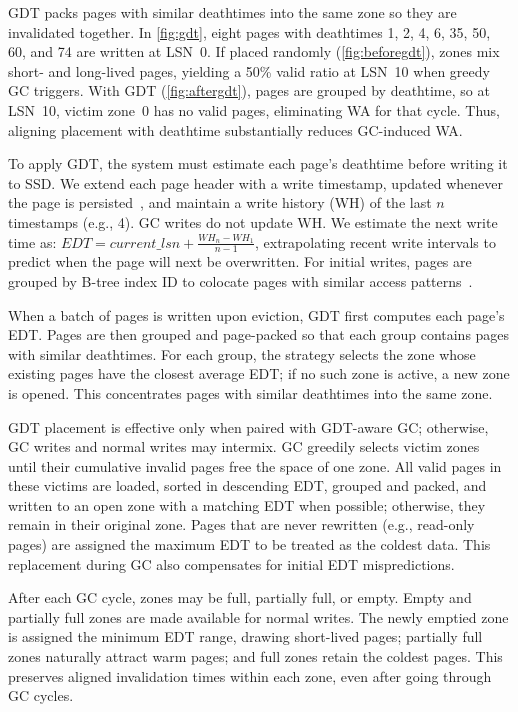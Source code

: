 GDT packs pages with similar deathtimes into the same zone so they are invalidated together. 
In \cref{fig:gdt}, eight pages with deathtimes 1, 2, 4, 6, 35, 50, 60, and 74 are written at LSN~0. 
If placed randomly (\cref{fig:beforegdt}), zones mix short- and long-lived pages, yielding a 50\% valid ratio at LSN~10 when greedy GC triggers. 
With GDT (\cref{fig:aftergdt}), pages are grouped by deathtime, so at LSN~10, victim zone~0 has no valid pages, eliminating WA for that cycle. 
Thus, aligning placement with deathtime substantially reduces GC-induced WA.

To apply GDT, the system must estimate each page’s deathtime before writing it to SSD.
We extend each page header with a write timestamp, updated whenever the page is persisted~\cite{DBLP:journals/pvldb/VohringerL23}, and maintain a write history (WH) of the last $n$ timestamps (e.g., 4). GC writes do not update WH.
We estimate the next write time as: $\textit{EDT} = \textit{current\_lsn} + \frac{\textit{WH}_n - \textit{WH}_1}{n - 1}$,
extrapolating recent write intervals to predict when the page will next be overwritten.
For initial writes, pages are grouped by B-tree index ID to colocate pages with similar access patterns~\cite{DBLP:conf/sigmod/OzmenSSD10}.

When a batch of pages is written upon eviction, GDT first computes each page’s EDT.
Pages are then grouped and page-packed so that each group contains pages with similar deathtimes.
For each group, the strategy selects the zone whose existing pages have the closest average EDT; if no such zone is active, a new zone is opened.
This concentrates pages with similar deathtimes into the same zone.

GDT placement is effective only when paired with GDT-aware GC; otherwise, GC writes and normal writes may intermix.
GC greedily selects victim zones until their cumulative invalid pages free the space of one zone.
All valid pages in these victims are loaded, sorted in descending EDT, grouped and packed, and written to an open zone with a matching EDT when possible; otherwise, they remain in their original zone.
Pages that are never rewritten (e.g., read-only pages) are assigned the maximum EDT to be treated as the coldest data.
This replacement during GC also compensates for initial EDT mispredictions.

After each GC cycle, zones may be full, partially full, or empty.
Empty and partially full zones are made available for normal writes.
The newly emptied zone is assigned the minimum EDT range, drawing short-lived pages; partially full zones naturally attract warm pages; and full zones retain the coldest pages.
This preserves aligned invalidation times within each zone, even after going through GC cycles.


